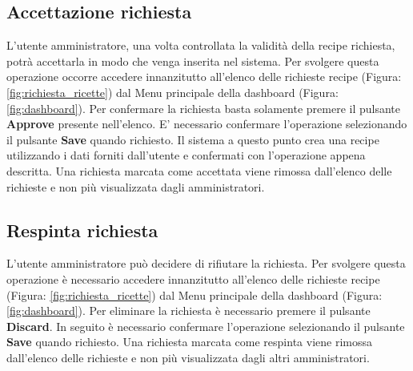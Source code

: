 	\subsection{Accettazione richiesta}
		L'utente amministratore, una volta controllata la validità della recipe\gloss{} richiesta, potrà accettarla in modo che venga inserita nel sistema\gloss{}.\newline
		Per svolgere questa operazione occorre accedere innanzitutto all'elenco delle richieste recipe\gloss{} (Figura: \ref{fig:richiesta_ricette}) dal Menu principale della dashboard\gloss{} (Figura: \ref{fig:dashboard}).\newline
		Per confermare la richiesta basta solamente premere il pulsante \textbf{Approve} presente nell'elenco.\newline
		E' necessario confermare l'operazione selezionando il pulsante \textbf{Save} quando richiesto.\newline
		Il sistema a questo punto crea una recipe\gloss{} utilizzando i dati forniti dall'utente e confermati con l'operazione appena descritta.\newline
		Una richiesta marcata come accettata viene rimossa dall'elenco delle richieste e non più visualizzata dagli amministratori.\newline


	\subsection{Respinta richiesta}
		L'utente amministratore può decidere di rifiutare la richiesta.
		Per svolgere questa operazione è necessario accedere innanzitutto all'elenco delle richieste recipe\gloss{} (Figura: \ref{fig:richiesta_ricette}) dal Menu principale della dashboard\gloss{} (Figura: \ref{fig:dashboard}).\newline
		Per eliminare la richiesta è necessario premere il pulsante \textbf{Discard}. In seguito è necessario confermare l'operazione selezionando il pulsante \textbf{Save} quando richiesto.\newline
		Una richiesta marcata come respinta viene rimossa dall'elenco delle richieste e non più visualizzata dagli altri amministratori.


